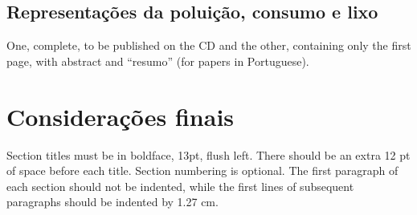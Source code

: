 \documentclass[12pt]{article}
\begin{document}
\subsection{Representações da poluição, consumo e lixo}
One, complete, to be
published on the CD and the other, containing only the first page, with
abstract and ``resumo'' (for papers in Portuguese).

\section{Considerações finais}

Section titles must be in boldface, 13pt, flush left. There should be an extra
12 pt of space before each title. Section numbering is optional. The first
paragraph of each section should not be indented, while the first lines of
subsequent paragraphs should be indented by 1.27 cm.



\end{document}
